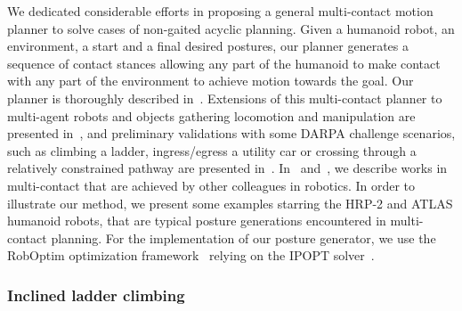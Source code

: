 We dedicated considerable efforts in proposing a general multi-contact motion planner to solve cases of non-gaited acyclic planning.
Given a humanoid robot, an environment, a start and a final desired postures, our planner generates a sequence of contact stances allowing any part of the humanoid to make contact with any part of the environment to achieve motion towards the goal.
Our planner is thoroughly described in~\cite{escande:ras:2013}.
Extensions of this multi-contact planner to multi-agent robots and objects gathering locomotion and manipulation are presented in~\cite{bouyarmane:ar:2012}, and preliminary validations with some DARPA challenge scenarios, such as climbing a ladder, ingress/egress a utility car or crossing through a relatively constrained pathway are presented in~\cite{bouyarmane:humanoids:2012}.
In~\cite{escande:ras:2013} and~\cite{bouyarmane:ar:2012}, we describe works in multi-contact that are achieved by other colleagues in robotics.
In order to illustrate our method, we present some examples starring the HRP-2 and ATLAS humanoid robots, that are typical posture generations encountered in multi-contact planning.
For the implementation of our posture generator, we use the RobOptim optimization framework~\cite{moulard:jsme:2013}{} relying on the IPOPT solver~\cite{wachter:mp:2006}{}.

\subsubsection{Inclined ladder climbing}
\label{subsubsec:inclined_ladder_climbing}

